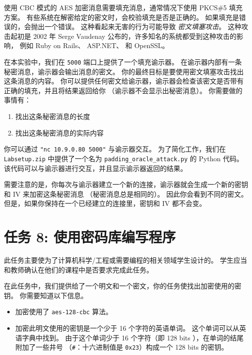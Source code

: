 使用 CBC 模式的 AES 加密消息需要填充消息，通常情况下使用 PKCS\#5 填充方案。
有些系统在解密给定的密文时，会校验填充是否是正确的。
如果填充是错误的，会抛出一个错误。
这种看起来无害的行为可能导致 \textit{密文填塞攻击}。
这种攻击起初是 2002 年 Serge Vaudenay 公布的，许多知名的系统都受到这种攻击的影响，
例如 Ruby on Rails、 ASP.NET、 和 OpenSSL。


在本实验中，我们在 \texttt{5000} 端口上提供了一个填充谕示器。
在谕示器内部有一条秘密消息，谕示器会输出消息的密文。
你的最终目标是要使用密文填塞攻击找出这条消息的内容。
你可以提供任何密文给谕示器，谕示器会检查该密文是否带有正确的填充，并且将结果返回给你
（谕示器不会显示出秘密消息）。
你需要做的事情有：

\begin{enumerate}
  \item 找出这条秘密消息的长度
  \item 找出这条秘密消息的实际内容
\end{enumerate}

你可以通过 \texttt{"nc 10.9.0.80 5000"} 与谕示器交互。
为了简化工作，我们在 \texttt{Labsetup.zip} 中提供了一个名为
\texttt{padding\_oracle\_attack.py} 的 Python 代码。
该代码可以与谕示器进行交互，并且显示谕示器返回的结果。

需要注意的是，你每次与谕示器建立一个新的连接，谕示器就会生成一个新的密钥和 IV 来加密这条秘密消息
（秘密消息总是相同的）。
因此你会看到不同的密文。
但是，如果你保持在一个已经建立的连接里，密钥和 IV 都不会变。



\section{任务 8: 使用密码库编写程序}

此任务主要使为了计算机科学/工程或需要编程的相关领域学生设计的。
学生应当和教师确认在他们的课程中是否要求完成此任务。


在此任务中，我们提供给了一个明文和一个密文，你的任务使找出加密使用的密钥。
你需要知道以下信息。

\begin{itemize}
\item 加密使用了 {\tt aes-128-cbc} 算法。
\item 加密此明文使用的密钥是一个少于 16 个字符的英语单词。
      这个单词可以从英语字典中找到。
      由于这个单词少于 16 个字符（即 128 bits ），在单词的结尾附加了一些井号
      （\texttt{\#}：十六进制值是 \texttt{0x23}）构成一个 128 bits 的密钥。
\end{itemize}


